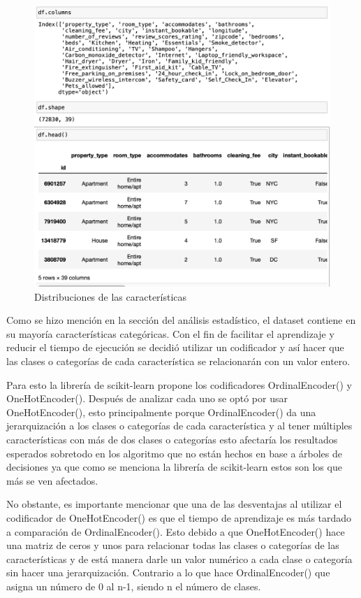 \documentclass[sigconf,authorversion,nonacm]{acmart}
\begin{document}
\begin{figure}[H]
  \centering
  \includegraphics[width=\linewidth]{dataset_actual.png}
  \caption{Distribuciones de las características}
\end{figure}

Como se hizo mención en la sección del análisis estadístico, el dataset contiene en su mayoría características categóricas. Con el fin de facilitar el aprendizaje y reducir el tiempo de ejecución se decidió utilizar un codificador y así hacer que las clases o categorías de cada característica se relacionarán con un valor entero.

Para esto la  librería de scikit-learn propone los codificadores OrdinalEncoder() y OneHotEncoder(). Después de analizar cada uno se optó por usar OneHotEncoder(),  esto principalmente porque OrdinalEncoder() da una jerarquización a los clases o categorías de cada característica y al tener múltiples características con más de dos clases o categorías esto afectaría los resultados esperados sobretodo en los algoritmo que no están hechos en base a árboles de decisiones ya que como se menciona la librería de scikit-learn estos son los que más se ven afectados. 

No obstante, es importante mencionar que una de las desventajas al utilizar el codificador de  OneHotEncoder() es que el tiempo de aprendizaje es más tardado a comparación de OrdinalEncoder(). Esto debido a que OneHotEncoder() hace una matriz de ceros y unos para relacionar todas las clases o categorías de las características y de está manera darle un valor numérico a cada clase o categoría sin hacer una jerarquización. Contrario a lo que hace OrdinalEncoder() que asigna un número de 0 al n-1, siendo n el número de clases. 
\end{document}
